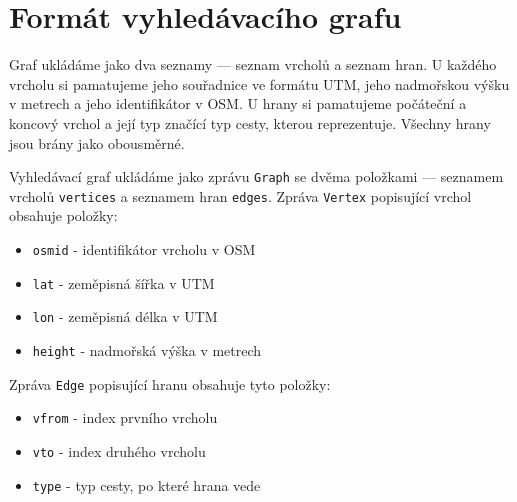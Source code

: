 \section{Formát vyhledávacího grafu}
Graf ukládáme jako dva seznamy --- seznam vrcholů a seznam hran. U každého
vrcholu si pamatujeme jeho souřadnice ve formátu UTM, jeho nadmořskou výšku v
metrech a jeho identifikátor v OSM. U hrany si pamatujeme počáteční a koncový
vrchol a její typ značící typ cesty, kterou reprezentuje. Všechny hrany jsou
brány jako obousměrné.

Vyhledávací graf ukládáme jako zprávu \verb|Graph| se dvěma položkami ---
seznamem vrcholů \verb|vertices| a seznamem hran \verb|edges|. Zpráva
\verb|Vertex| popisující vrchol obsahuje položky:
\begin{itemize}
	\item \verb|osmid| - identifikátor vrcholu v OSM
	\item \verb|lat| - zeměpisná šířka v UTM
	\item \verb|lon| - zeměpisná délka v UTM
	\item \verb|height| - nadmořská výška v metrech
\end{itemize}
Zpráva \verb|Edge| popisující hranu obsahuje tyto položky:
\begin{itemize}
	\item \verb|vfrom| - index prvního vrcholu
	\item \verb|vto| - index druhého vrcholu
	\item \verb|type| - typ cesty, po které hrana vede
\end{itemize}

